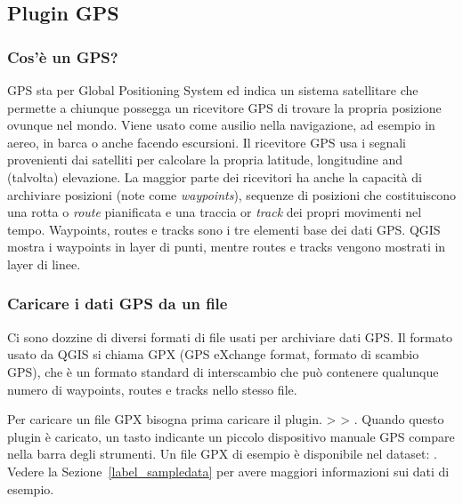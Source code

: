 
\subsection{Plugin GPS }\label{label_plugingps}


\subsubsection{Cos'è un GPS?}\label{whatsgps}

GPS sta per Global Positioning System ed indica un sistema satellitare che permette a chiunque possegga un ricevitore GPS di trovare la propria posizione ovunque nel mondo.
Viene usato come ausilio nella navigazione, ad esempio in aereo, in barca o anche facendo escursioni.
Il ricevitore GPS usa i segnali provenienti dai satelliti per calcolare la propria latitude, longitudine and (talvolta) elevazione.
La maggior parte dei ricevitori ha anche la capacità di archiviare posizioni (note come \emph{waypoints}), sequenze di posizioni che costituiscono una rotta o \emph{route} pianificata e una traccia or \emph{track} dei propri movimenti nel tempo.
Waypoints, routes e tracks sono i tre elementi base dei dati GPS.
QGIS mostra i waypoints in layer di punti, mentre routes e tracks vengono mostrati in layer di linee.

\subsubsection{Caricare i dati GPS da un file}\label{label_loadgps}

Ci sono dozzine di diversi formati di file usati per archiviare dati GPS. Il formato usato da QGIS si chiama GPX (GPS eXchange format, formato di scambio GPS), che è un formato standard di interscambio che può contenere qualunque numero di waypoints, routes e tracks nello stesso file.

Per caricare un file GPX bisogna prima caricare il plugin.
 >  > . Quando questo plugin è caricato, un tasto indicante un piccolo dispositivo manuale GPS compare nella barra degli strumenti. Un file GPX di esempio è disponibile nel dataset:
. Vedere la Sezione~\ref{label_sampledata} per avere maggiori informazioni sui dati di esempio.


